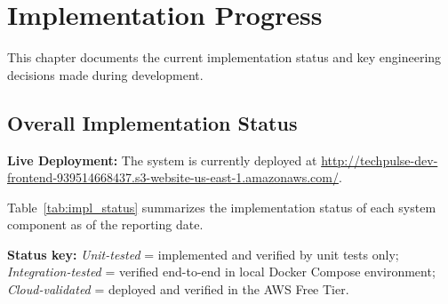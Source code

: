 \chapter{Implementation Progress}
\label{ch:progress}

This chapter documents the current implementation status and key engineering decisions made during development.

\section{Overall Implementation Status}
\label{sec:impl_status}

\noindent\textbf{Live Deployment:} The system is currently deployed at \url{http://techpulse-dev-frontend-939514668437.s3-website-us-east-1.amazonaws.com/}.

Table~\ref{tab:impl_status} summarizes the implementation status of each system component as of the reporting date.

\noindent\textbf{Status key:} \textit{Unit-tested} = implemented and verified by unit tests only; \textit{Integration-tested} = verified end-to-end in local Docker Compose environment; \textit{Cloud-validated} = deployed and verified in the AWS Free Tier.

